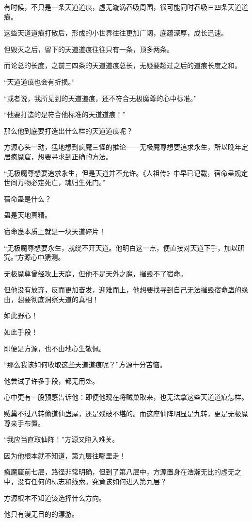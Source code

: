 \begin{this_body}
有时候，不只是一条天道道痕，虚无漩涡吞吸周围，很可能同时吞吸三四条天道道痕。

这些天道道痕打散后，形成的小世界往往更加广阔，底蕴深厚，成长迅速。

但毁灭之后，留下的天道道痕往往只有一条，顶多两条。

而论总的长度，之前三四条的天道道痕总长，无疑要超过之后的道痕长度之和。

“天道道痕也会有折损。”

“或者说，我所见到的天道道痕，还不符合无极魔尊的心中标准。”

“他要打造的是符合他标准的天道道痕！”

那么他到底要打造出什么样的天道道痕呢？

方源心头一动，猛地想到疯魔三怪的推论——无极魔尊想要追求永生，所以晚年定居疯魔窟，想要寻求到正确的方法。

“无极魔尊想要追求永生，但是天道并不允许。《人祖传》中早已记载，宿命蛊规定世间万物必定死亡，魂归生死门。”

宿命蛊是什么？

蛊是天地真精。

宿命蛊本质上就是一块天道碎片！

“无极魔尊想要永生，就绕不开天道。他明白这一点，便直接对天道下手，加以研究。”方源心中猜测。

无极魔尊曾经攻上天庭，但他不是天外之魔，摧毁不了宿命。

但他没有放弃，反而更加奋发，迎难而上，他想要找寻到自己无法摧毁宿命蛊的缘由，想要彻底洞察天道的真相！

如此野心！

如此手段！

即便是方源，也不由地心生敬佩。

“那么我该如何收取这些天道道痕呢？”方源十分苦恼。

他尝试了许多手段，都无用处。

心中更有一股预感告诉他：即便他现在将贼巢取来，也无法拿这些天道道痕怎样。

贼巢不过八转偷道仙蛊屋，还是残破不堪的。而这座仙阵明显是九转，更是无极魔尊亲手布置。

“我应当直取仙阵！”方源又陷入难关。

因为他根本就不知道，第九层往哪里走！

疯魔窟前七层，路径非常明确，但到了第八层中，方源置身在浩瀚无比的虚无之中，没有任何的标志和线索。究竟该如何进入第九层？

方源根本不知道该选择什么方向。

他只有漫无目的的漂游。


\end{this_body}
